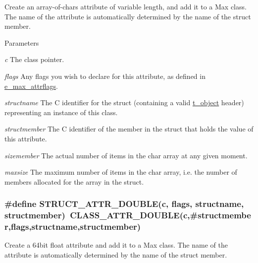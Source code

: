 Create an array-\/of-\/chars attribute of variable length, and add it to a Max class. The name of the attribute is automatically determined by the name of the struct member.


\begin{DoxyParams}{Parameters}
\item[{\em c}]The class pointer. \item[{\em flags}]Any flags you wish to declare for this attribute, as defined in \hyperlink{group__attr_gaf296cfc6741bb19207f6ed8062809115}{e\_\-max\_\-attrflags}. \item[{\em structname}]The C identifier for the struct (containing a valid \hyperlink{structt__object}{t\_\-object} header) representing an instance of this class. \item[{\em structmember}]The C identifier of the member in the struct that holds the value of this attribute. \item[{\em sizemember}]The actual number of items in the char array at any given moment. \item[{\em maxsize}]The maximum number of items in the char array, i.e. the number of members allocated for the array in the struct. \end{DoxyParams}
\hypertarget{group__attr_ga8d3bad9fc716cf6bd2dd6052e96a115b}{
\subsubsection[{STRUCT\_\-ATTR\_\-DOUBLE}]{\setlength{\rightskip}{0pt plus 5cm}\#define STRUCT\_\-ATTR\_\-DOUBLE(c, \/  flags, \/  structname, \/  structmember)~CLASS\_\-ATTR\_\-DOUBLE(c,\#structmember,flags,structname,structmember)}}
\label{group__attr_ga8d3bad9fc716cf6bd2dd6052e96a115b}


Create a 64bit float attribute and add it to a Max class. The name of the attribute is automatically determined by the name of the struct member.


